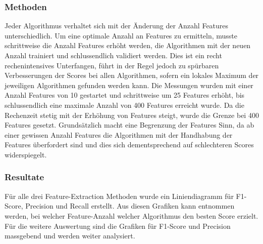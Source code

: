 \subsubsection{Methoden}
Jeder Algorithmus verhaltet sich mit der Änderung der Anzahl Features unterschiedlich.
Um eine optimale Anzahl an Features zu ermitteln, musste schrittweise die Anzahl Features erhöht werden, die Algorithmen mit der neuen Anzahl trainiert und schlussendlich validiert werden.
Dies ist ein recht rechenintensives Unterfangen, führt in der Regel jedoch zu spürbaren Verbesserungen der Scores bei allen Algorithmen, sofern ein lokales Maximum der jeweiligen Algorithmen gefunden werden kann.
Die Messungen wurden mit einer Anzahl Features von 10 gestartet und schrittweise um 25 Features erhöht, bis schlussendlich eine maximale Anzahl von 400 Features erreicht wurde.
Da die Rechenzeit stetig mit der Erhöhung von Features steigt, wurde die Grenze bei 400 Features gesetzt.
Grundsätzlich macht eine Begrenzung der Features Sinn, da ab einer gewissen Anzahl Features die Algorithmen mit der Handhabung der Features überfordert sind und dies sich dementsprechend auf schlechteren Scores widerspiegelt.
\subsubsection{Resultate}
Für alle drei Feature-Extraction Methoden wurde ein Liniendiagramm für F1-Score, Precision und Recall erstellt.
Aus diesen Grafiken kann entnommen werden, bei welcher Feature-Anzahl welcher Algorithmus den besten Score erzielt.
Für die weitere Auswertung sind die Grafiken für F1-Score und Precision massgebend und werden weiter analysiert.
